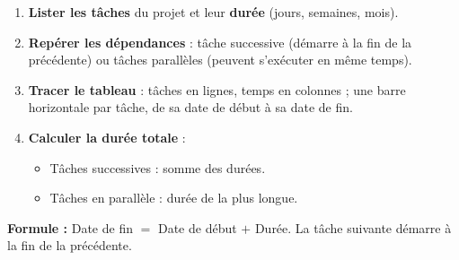 \documentclass[11pt]{article}
\begin{document}
\begin{methode}
\begin{enumerate}
\item \textbf{Lister les tâches} du projet et leur \textbf{durée} (jours, semaines, mois).
\item \textbf{Repérer les dépendances} : tâche successive (démarre à la fin de la précédente) ou tâches parallèles (peuvent s'exécuter en même temps).
\item \textbf{Tracer le tableau} : tâches en lignes, temps en colonnes ; une barre horizontale par tâche, de sa date de début à sa date de fin.
\item \textbf{Calculer la durée totale} :
      \begin{itemize}
      \item Tâches successives : somme des durées.
      \item Tâches en parallèle : durée de la plus longue.
      \end{itemize}
\end{enumerate}
\textbf{Formule :} Date de fin $=$ Date de début $+$ Durée. La tâche suivante démarre à la fin de la précédente.
\end{methode}
\end{document}
